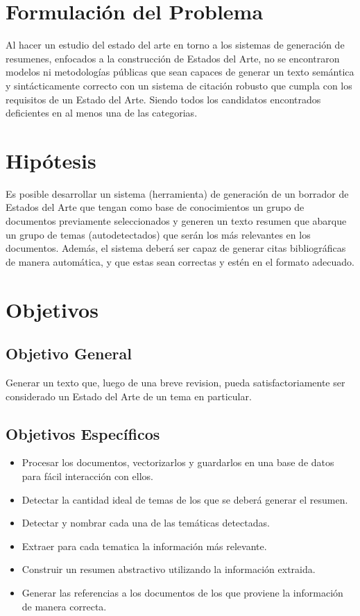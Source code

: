 \section{Formulación del Problema}
    Al hacer un estudio del estado del arte en torno a los sistemas de generación de resumenes, enfocados a la construcción de Estados del Arte, no se encontraron modelos ni metodologías públicas que sean capaces de generar un texto semántica y sintácticamente correcto con un sistema de citación robusto que cumpla con los requisitos de un Estado del Arte. Siendo todos los candidatos encontrados deficientes en al menos una de las categorias.

\section{Hipótesis}
    Es posible desarrollar un sistema (herramienta) de generación de un borrador de Estados del Arte que tengan como base de conocimientos un grupo de documentos previamente seleccionados y generen un texto resumen que abarque un grupo de temas (autodetectados) que serán los más relevantes en los documentos. Además, el sistema deberá ser capaz de generar citas bibliográficas de manera automática, y que estas sean correctas y estén en el formato adecuado.

\section{Objetivos}
    \subsection{Objetivo General}

        Generar un texto que, luego de una breve revision, pueda satisfactoriamente ser considerado un Estado del Arte de un tema en particular.

    \subsection{Objetivos Específicos}

        \begin{itemize}
            \item Procesar los documentos, vectorizarlos y guardarlos en una base de datos para fácil interacción con ellos.
            \item Detectar la cantidad ideal de temas de los que se deberá generar el resumen.
            \item Detectar y nombrar cada una de las temáticas detectadas.
            \item Extraer para cada tematica la información más relevante.
            \item Construir un resumen abstractivo utilizando la información extraida.
            \item Generar las referencias a los documentos de los que proviene la información de manera correcta.

        \end{itemize}



